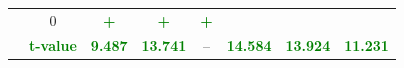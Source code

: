 \documentclass[11pt,english,a4paper,hidelinks]{book}
\begin{document}
\begin{table}[H]
\begin{tabular}{lccccccc}
                     & 0
                     & \textbf{\textcolor{green}{+}}
                     & \textbf{\textcolor{green}{+}}
                     & \textbf{\textcolor{green}{+}} \\
            & \textbf{\textcolor{green}{t-value}}
                     & \textbf{\textcolor{green}{9.487}}
                     & \textbf{\textcolor{green}{13.741}}
                     & --
                     & \textbf{\textcolor{green}{14.584}}
                     & \textbf{\textcolor{green}{13.924}}
                     & \textbf{\textcolor{green}{11.231}} \\
        \bottomrule
    \end{tabular}
    \label{tab:europe_dividend_consistency}
\end{table}

\end{document}
